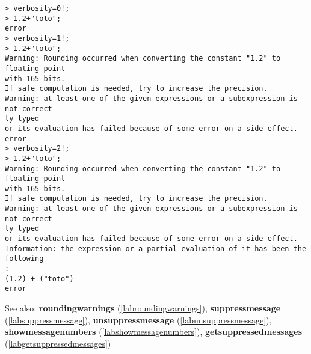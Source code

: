 \begin{center}\begin{minipage}{15cm}\begin{Verbatim}[frame=single,commandchars=\\\|\~]
> verbosity=0!;
> 1.2+"toto";
error
> verbosity=1!;
> 1.2+"toto";
Warning: Rounding occurred when converting the constant "1.2" to floating-point 
with 165 bits.
If safe computation is needed, try to increase the precision.
Warning: at least one of the given expressions or a subexpression is not correct
ly typed
or its evaluation has failed because of some error on a side-effect.
error
> verbosity=2!;
> 1.2+"toto";
Warning: Rounding occurred when converting the constant "1.2" to floating-point 
with 165 bits.
If safe computation is needed, try to increase the precision.
Warning: at least one of the given expressions or a subexpression is not correct
ly typed
or its evaluation has failed because of some error on a side-effect.
Information: the expression or a partial evaluation of it has been the following
:
(1.2) + ("toto")
error
\end{Verbatim}
\end{minipage}\end{center}
See also: \textbf{roundingwarnings} (\ref{labroundingwarnings}), \textbf{suppressmessage} (\ref{labsuppressmessage}), \textbf{unsuppressmessage} (\ref{labunsuppressmessage}), \textbf{showmessagenumbers} (\ref{labshowmessagenumbers}), \textbf{getsuppressedmessages} (\ref{labgetsuppressedmessages})
